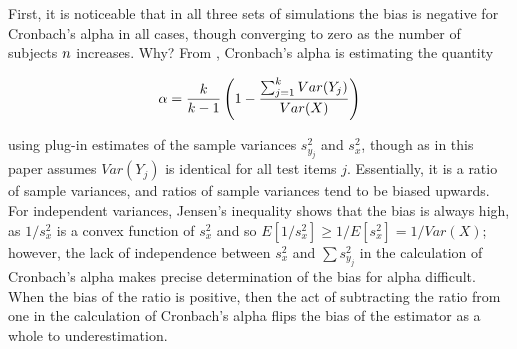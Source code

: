 \documentclass[12pt,epsfig]{article}
\newcommand{\changed}[1]{\textcolor{black}{#1}}
\newcommand{\numsubjects}{\changed{n}}%
\newcommand{\testlength}{\changed{k}}%
\begin{document}

First, it is noticeable that in all three sets of simulations the bias is negative for Cronbach's alpha in all cases, though converging to zero as the number of subjects $\numsubjects$ increases. Why? From \cite{Foster2020}, Cronbach's alpha is estimating the quantity

\begin{equation*}
    \alpha = \dfrac{\testlength}{\testlength-1} \displaystyle \left(1 - \dfrac{\sum_{j = 1}^{\testlength} Var(Y_{j})}{Var(X)}\right)
 \end{equation*}

\noindent using plug-in estimates of the sample variances $s^2_{y_j}$ and $s^2_x$, though as in \cite{Foster2020} this paper assumes $Var(Y_{j})$ is identical for all test items $j$. Essentially, it is a ratio of sample variances, and ratios of sample variances tend to be biased upwards. For independent variances, Jensen's inequality shows that the bias is always high, as $1/s^2_x$ is a convex function of $s^2_x$ and so $E[1/s^2_x] \ge 1/E[s^2_x] = 1/Var(X)$; however, the lack of independence between $s^2_x$ and $\sum s^2_{y_j}$ in the calculation of Cronbach's alpha makes precise determination of the bias for alpha difficult. When the bias of the ratio is positive, then the act of subtracting the ratio from one in the calculation of Cronbach's alpha flips the bias of the estimator as a whole to underestimation. %
\end{document}
